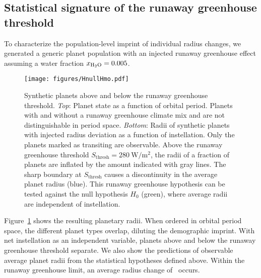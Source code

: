 \documentclass[modern]{aastex631}
\begin{document}
\subsection{Statistical signature of the runaway greenhouse threshold}
To characterize the population-level imprint of individual radius changes, we generated a generic planet population with an injected runaway greenhouse effect assuming a water fraction $x_\mathrm{H_2O} = 0.005$.
\begin{figure}
    \begin{centering}
        \texttt{[image: figures/HnullHmo.pdf]}
        \caption{Synthetic planets above and below the runaway greenhouse threshold.
        \textit{Top}: Planet state as a function of orbital period. Planets with and without a runaway greenhouse climate mix and are not distinguishable in period space.
        \textit{Bottom}: Radii of synthetic planets with injected radius deviation as a function of instellation. Only the planets marked as transiting are observable. Above the runaway greenhouse threshold $S_\mathrm{thresh} =\SI{280}{\watt\per\meter\squared} $, the radii of a fraction of planets are inflated by the amount indicated with gray lines. The sharp boundary at $S_\mathrm{thresh}$ causes a discontinuity in the average planet radius (blue). This runaway greenhouse hypothesis can be tested against the null hypothesis $H_0$ (green), where average radii are independent of instellation.}
        \label{fig:HnullHmo}
    \end{centering}
\end{figure}
Figure~\ref{fig:HnullHmo} shows the resulting planetary radii.
When ordered in orbital period space, the different planet types overlap, diluting the demographic imprint.
With net instellation as an independent variable, planets above and below the runaway greenhouse threshold separate.
We also show the predictions of observable average planet radii from the statistical hypotheses defined above.
Within the runaway greenhouse limit, an average radius change of \avgRadiusChange\ occurs.
\end{document}
